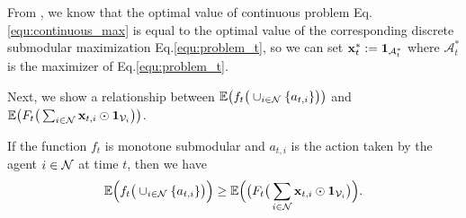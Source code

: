 From \citet{calinescu2011maximizing,chekuri2014submodular}, we know that the optimal value of continuous problem Eq.\eqref{equ:continuous_max} is equal to the optimal value of the corresponding discrete submodular maximization Eq.\eqref{equ:problem_t}, so we can set $\mathbf{x}^{*}_{t}:=\mathbf{1}_{\mathcal{A}_{t}^{*}}$ where $\mathcal{A}_{t}^{*}$ is the maximizer of Eq.\eqref{equ:problem_t}.

Next, we show a relationship between $\mathbb{E}\big(f_{t}\big(\cup_{i\in\mathcal{N}}\{a_{t,i}\}\big)\big)$ and $\mathbb{E}\big(F_{t}\big(\sum_{i\in\mathcal{N}}\mathbf{x}_{t,i}\odot\mathbf{1}_{\mathcal{V}_{i}}\big)\big)$.
	\begin{lemma}\label{lemma:rounding1}
			If the function $f_{t}$ is monotone submodular and $a_{t,i}$ is the action taken by the agent $i\in\mathcal{N}$ at time $t$, then we have 
		\begin{equation*}
		\mathbb{E}\Big(f_{t}\big(\cup_{i\in\mathcal{N}}\{a_{t,i}\}\big)\Big)\ge\mathbb{E}\Big(\big(F_{t}\big(\sum_{i\in\mathcal{N}}\mathbf{x}_{t,i}\odot\mathbf{1}_{\mathcal{V}_{i}}\big)\Big).  
		\end{equation*}
	\end{lemma}
